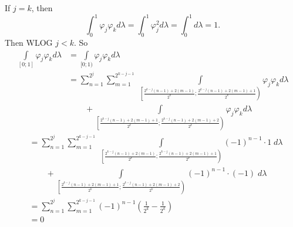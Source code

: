\documentclass[12pt,a4paper]{article}
\begin{document}
    \begin{enumproblem}
        If $j = k$, then
        \[\int_0^1 \varphi_j \varphi_k d\lambda = \int_0^1 \varphi_j^2 d\lambda = \int_0^1 d\lambda = 1.\]
        Then WLOG $j < k$. So
        \begin{align*}
            \int\limits_{[0; 1]} \varphi_j \varphi_k d\lambda
            &= \int\limits_{[0; 1)} \varphi_j \varphi_k d\lambda\\
            &= \sum_{n=1}^{2^j}\sum_{m=1}^{2^{k-j-1}}\; \int\limits_{\left[\tfrac{2^{k-j}(n-1) + 2(m-1)}{2^k}; \tfrac{2^{k-j}(n-1) + 2(m-1) + 1}{2^k}\right)} \varphi_j \varphi_k d\lambda\\
            &\qquad + \int\limits_{\left[\tfrac{2^{k-j}(n-1) + 2(m-1) + 1}{2^k}; \tfrac{2^{k-j}(n-1) + 2(m-1) + 2}{2^k}\right)} \varphi_j \varphi_k d\lambda
        \end{align*}
        \begin{align*}
            &= \sum_{n=1}^{2^j}\sum_{m=1}^{2^{k-j-1}}\; \int\limits_{\left[\tfrac{2^{k-j}(n-1) + 2(m-1)}{2^k}; \tfrac{2^{k-j}(n-1) + 2(m-1) + 1}{2^k}\right)} (-1)^{n-1} \cdot 1\; d\lambda\\
            &\qquad + \int\limits_{\left[\tfrac{2^{k-j}(n-1) + 2(m-1) + 1}{2^k}; \tfrac{2^{k-j}(n-1) + 2(m-1) + 2}{2^k}\right)} (-1)^{n-1} \cdot (-1)\; d\lambda\\
            &= \sum_{n=1}^{2^j}\sum_{m=1}^{2^{k-j-1}} (-1)^{n-1} \left(\frac{1}{2^k} - \frac{1}{2^k}\right)\\
            &= 0
        \end{align*}
    \end{enumproblem}
\end{document}
